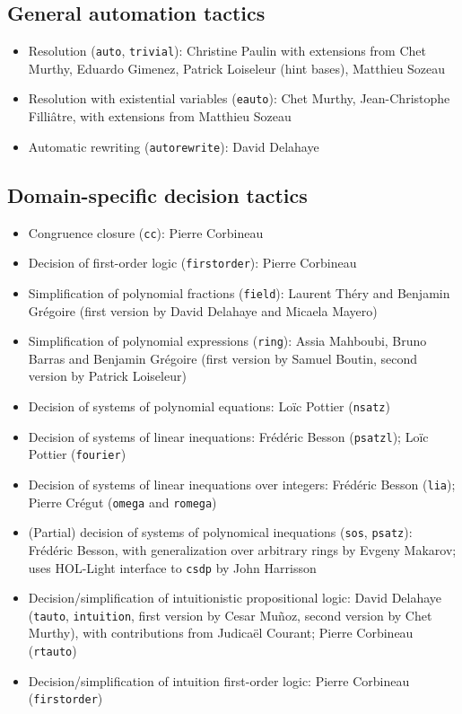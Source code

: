 \documentclass{article}
\begin{document}
\subsection{General automation tactics}

\begin{itemize}
\item Resolution (\texttt{auto}, \texttt{trivial}): Christine Paulin
  with extensions from Chet Murthy, Eduardo Gimenez, Patrick
  Loiseleur (hint bases), Matthieu Sozeau
\item Resolution with existential variables (\texttt{eauto}): Chet Murthy, Jean-Christophe Filliâtre, with extensions from Matthieu Sozeau
\item Automatic rewriting (\texttt{autorewrite}): David Delahaye
\end{itemize}

\subsection{Domain-specific decision tactics}

\begin{itemize}
\item Congruence closure (\texttt{cc}): Pierre Corbineau
\item Decision of first-order logic (\texttt{firstorder}): Pierre Corbineau
\item Simplification of polynomial fractions (\texttt{field}): Laurent
  Théry and Benjamin Grégoire (first version by David Delahaye and
  Micaela Mayero)
\item Simplification of polynomial expressions (\texttt{ring}): Assia
  Mahboubi, Bruno Barras and Benjamin Grégoire (first version by
  Samuel Boutin, second version by Patrick Loiseleur)
\item Decision of systems of polynomial equations: Loïc Pottier (\texttt{nsatz})
\item Decision of systems of linear inequations: Frédéric Besson
  (\texttt{psatzl}); Loïc Pottier (\texttt{fourier})
\item Decision of systems of linear inequations over integers:
  Frédéric Besson (\texttt{lia}); Pierre Crégut (\texttt{omega} and
  \texttt{romega})
\item (Partial) decision of systems of polynomical inequations
  (\texttt{sos}, \texttt{psatz}): Frédéric Besson, with generalization
  over arbitrary rings by Evgeny Makarov; uses HOL-Light interface to
  \texttt{csdp} by John Harrisson
\item Decision/simplification of intuitionistic propositional logic:
  David Delahaye (\texttt{tauto}, \texttt{intuition}, first version by
  Cesar Mu\~noz, second version by Chet Murthy), with contributions
  from Judicaël Courant; Pierre Corbineau (\texttt{rtauto})
\item Decision/simplification of intuition first-order logic: Pierre
  Corbineau (\texttt{firstorder})
\end{itemize}
\end{document}
